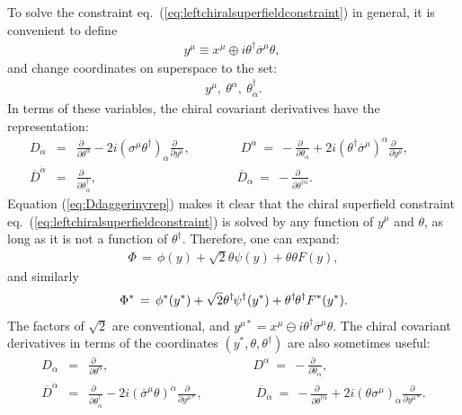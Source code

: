 \documentclass[12pt]{article}
\def\BDplus{+}
\def\BDminus{-}
\def\thetasigmamuthetadagger{\theta\sigma^\mu\theta^\dagger}
\def\BDplus{-}
\def\BDminus{+}
\def\thetasigmamuthetadagger{\theta^\dagger\sigmabar^\mu\theta}
\def\BDplus{\oplus}
\def\BDminus{\ominus}
\def\thetasigmamuthetadagger{\theta\sigma^\mu\theta^\dagger}
\def\BDplus{\ominus}
\def\BDminus{\oplus}
\def\thetasigmamuthetadagger{\theta^\dagger\sigmabar^\mu\theta}
\newcommand{\thdthd}{\theta^\dagger\hspace{-1pt}\theta^\dagger}
\def\beq{\begin{eqnarray}}
\def\eeq{\end{eqnarray}}
\def\sigmabar{\overline\sigma}
\def\Dcon{\overline D}
\begin{document}
To solve the constraint eq.~(\ref{eq:leftchiralsuperfieldconstraint}) in 
general, it is convenient to define
\beq
y^\mu \equiv x^\mu \BDminus i \thetasigmamuthetadagger ,\>
\label{eq:defineycoord}
\eeq
and change coordinates on superspace to the set:
\beq
y^\mu,\>\theta^\alpha,\>\theta^\dagger_{\dot\alpha}.
\eeq
In terms of these variables, the chiral covariant derivatives have the 
representation:
\beq
D_\alpha &=& \frac{\partial\phantom{x}}{\partial\theta^\alpha} 
-2i (\sigma^\mu \theta^\dagger)_\alpha 
\frac{\partial\phantom{x}}{\partial y^\mu} ,
\qquad\qquad
D^\alpha \>=\> -\frac{\partial\phantom{x}}{\partial\theta_\alpha} 
+2i (\theta^\dagger \sigmabar^\mu)^\alpha 
\frac{\partial\phantom{x}}{\partial y^\mu} ,
\phantom{xxxx}
\label{eq:Dinyrep}
\\
\Dcon^{\dot\alpha} &=& 
\frac{\partial\phantom{x}}{\partial\theta^\dagger_{\dot\alpha}} , 
\qquad\qquad\qquad\qquad\qquad\>\>\>\>\>
\Dcon_{\dot\alpha} \>=\> 
-\frac{\partial\phantom{x}}{\partial\theta^{\dagger\dot\alpha}} . 
\label{eq:Ddaggerinyrep}
\eeq
Equation (\ref{eq:Ddaggerinyrep}) makes it clear that the chiral 
superfield 
constraint eq.~(\ref{eq:leftchiralsuperfieldconstraint}) is solved by any 
function of $y^\mu$ and $\theta$, as long as it is not a function of $\theta^\dagger$. 
Therefore, one can expand:
\beq
\Phi \,=\,
\phi(y) + \sqrt{2}\theta \psi(y) + \theta\theta F(y) ,
\label{eq:Phiinyrep}
\eeq
and similarly
\beq
\Phi^* \,=\, 
\phi^*(y^*) + \sqrt{2}\theta^\dagger\hspace{-1pt} \psi^\dagger(y^*) 
+ \thdthd F^*(y^*) .
\label{eq:Phistarinyrep}
\eeq
The factors of $\sqrt{2}$ are conventional, and
$y^{\mu *} = x^\mu \BDplus i \thetasigmamuthetadagger $.
The chiral covariant derivatives in terms of the coordinates 
$(y^*,\theta,\theta^\dagger)$ are also sometimes useful:
\beq
D_\alpha &=& \frac{\partial\phantom{x}}{\partial\theta^\alpha} 
,
\qquad\qquad
\qquad\qquad\>
\qquad\quad\>
D^\alpha \>=\> -\frac{\partial\phantom{x}}{\partial\theta_\alpha} 
,
\\
\Dcon^{\dot\alpha} &=& 
\frac{\partial\phantom{x}}{\partial\theta^\dagger_{\dot\alpha}} 
-2i (\sigmabar^\mu \theta)^{\dot\alpha} 
\frac{\partial}{\partial y^{\mu *}}
,
\qquad\qquad\>
\Dcon_{\dot\alpha} \>=\> 
-\frac{\partial\phantom{x}}{\partial\theta^{\dagger\dot\alpha}} 
+2i (\theta \sigma^\mu)_{\dot\alpha}
\frac{\partial}{\partial y^{\mu *}}
.
\eeq
\end{document}
